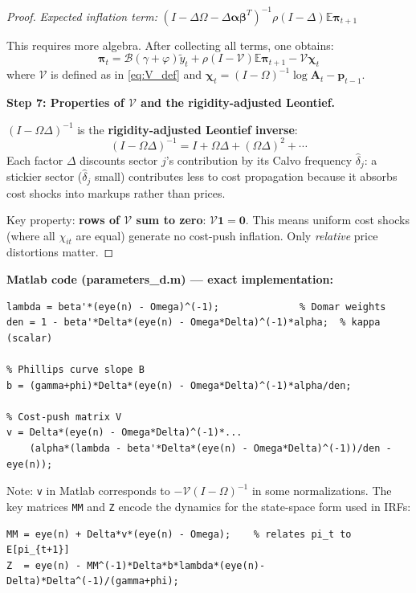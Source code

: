 \documentclass[12pt]{article}
\begin{document}
\begin{proof}
\textit{Expected inflation term:}
$(I-\Delta\Omega-\Delta\bm{\alpha}\bm{\beta}^T)^{-1}\rho(I-\Delta)\mathbb{E}\bm{\pi}_{t+1}$

This requires more algebra. After collecting all terms, one obtains:
\begin{equation}
    \bm{\pi}_t = \mathcal{B}(\gamma+\varphi)\tilde{y}_t + \rho(I-\mathcal{V})\mathbb{E}\bm{\pi}_{t+1} - \mathcal{V}\bm{\chi}_t
\end{equation}
where $\mathcal{V}$ is defined as in \eqref{eq:V_def} and $\bm{\chi}_t = (I-\Omega)^{-1}\log\mathbf{A}_t - \bm{p}_{t-1}$.

\medskip
\textbf{Step 7: Properties of $\mathcal{V}$ and the rigidity-adjusted Leontief.}

$(I-\Omega\Delta)^{-1}$ is the \textbf{rigidity-adjusted Leontief inverse}:
\begin{equation}
    (I-\Omega\Delta)^{-1} = I + \Omega\Delta + (\Omega\Delta)^2 + \cdots
\end{equation}
Each factor $\Delta$ discounts sector $j$'s contribution by its Calvo frequency $\hat{\delta}_j$: a stickier sector ($\hat{\delta}_j$ small) contributes less to cost propagation because it absorbs cost shocks into markups rather than prices.

Key property: \textbf{rows of $\mathcal{V}$ sum to zero}: $\mathcal{V}\mathbf{1} = \mathbf{0}$. This means uniform cost shocks (where all $\chi_{it}$ are equal) generate no cost-push inflation. Only \textit{relative} price distortions matter.
\end{proof}

\begin{codebox}
\textbf{Matlab code (parameters\_d.m) — exact implementation:}
\begin{verbatim}
lambda = beta'*(eye(n) - Omega)^(-1);              % Domar weights
den = 1 - beta'*Delta*(eye(n) - Omega*Delta)^(-1)*alpha;  % kappa (scalar)

% Phillips curve slope B
b = (gamma+phi)*Delta*(eye(n) - Omega*Delta)^(-1)*alpha/den;

% Cost-push matrix V
v = Delta*(eye(n) - Omega*Delta)^(-1)*...
    (alpha*(lambda - beta'*Delta*(eye(n) - Omega*Delta)^(-1))/den - eye(n));
\end{verbatim}

Note: \texttt{v} in Matlab corresponds to $-\mathcal{V}(I-\Omega)^{-1}$ in some normalizations. The key matrices \texttt{MM} and \texttt{Z} encode the dynamics for the state-space form used in IRFs:
\begin{verbatim}
MM = eye(n) + Delta*v*(eye(n) - Omega);    % relates pi_t to E[pi_{t+1}]
Z  = eye(n) - MM^(-1)*Delta*b*lambda*(eye(n)-Delta)*Delta^(-1)/(gamma+phi);
\end{verbatim}
\end{codebox}
\end{document}
